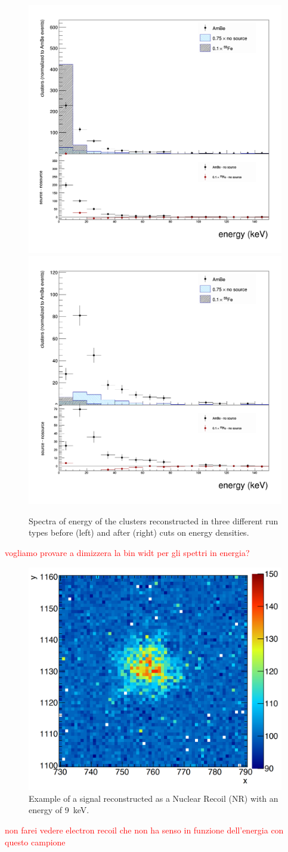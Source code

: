 \documentclass[12pt]{iopart}
\begin{document}
\begin{figure}[ht]
	\centering
	\includegraphics[width=0.45\linewidth]{energyExt.png}
	\includegraphics[width=0.45\linewidth]{energyExt_cut.png}
  	\caption{Spectra of energy of the clusters reconstructed in three different run types before (left) and after (right) cuts on energy densities.}
  	\label{fig:energy}
\end{figure}
\textcolor{red}{vogliamo provare a dimizzera la bin widt per gli spettri in energia?}
\begin{figure}[ht]
	\centering
	\includegraphics[width=0.50\linewidth]{granchio.png}
  	\caption{Example of a signal reconstructed as a Nuclear Recoil (NR) with an energy of 9~keV.}
  	\label{fig:granchio}
\end{figure}

\textcolor{red}{non farei vedere electron recoil che non ha senso in funzione dell'energia con questo campione }


{}

\end{document}
